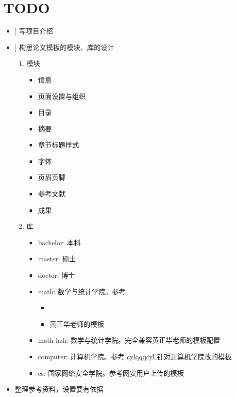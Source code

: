 

\chapter{TODO}

\newcommand\Done{\faCheckSquare[regular]} %
\newcommand\HalfDone{\faMinusSquare[regular]} %
\newcommand\NotDone{\faSquare[regular]} %
\newcommand\ToBeSpecified{\faPlusSquare[regular]} %

\goodbreak
\begin{itemize}[midpenalty=-1000,
  label=\protect\raisebox{-.3ex}{\NotDone}]
  \item[\Done] 写项目介绍
  \item[\ToBeSpecified] 构思论文模板的模块、库的设计
    \begin{enumerate}
      \item 模块
        \begin{itemize}[midpenalty=-1000,
          label=\protect\raisebox{-.3ex}{\NotDone}]
          \item 信息
          \item 页面设置与组织
          \item 目录
          \item 摘要
          \item 章节标题样式
          \item 字体
          \item 页眉页脚
          \item 参考文献
          \item 成果
        \end{itemize}
      \item 库
        \begin{itemize}[midpenalty=-1000,
          label=\protect\raisebox{-.3ex}{\NotDone}]
          \item bachelor: 本科
          \item master: 硕士
          \item doctor: 博士
          \item math: 数学与统计学院。参考
            \begin{itemize}
              \item {}
              \item 黄正华老师的模板
            \end{itemize}
          \item math-hzh: 数学与统计学院。完全兼容黄正华老师的模板配置
          \item computer: 计算机学院。参考 \href{https://github.com/cylqqqcyl/whu-thesis-2024}{cylqqqcyl 针对计算机学院改的模板}
          \item cs: 国家网络安全学院。参考网安用户上传的模板
        \end{itemize}
    \end{enumerate}
  \item 整理参考资料，设置要有依据
\end{itemize}
